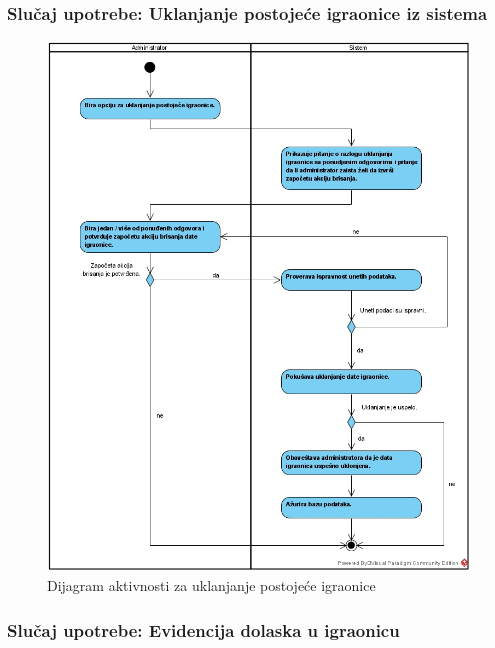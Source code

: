 \documentclass[a4paper]{article}
\begin{document}
\subsubsection{Slučaj upotrebe: Uklanjanje postojeće igraonice iz sistema}

\begin{figure}[!ht]
\begin{center}
\includegraphics[scale=0.55]{sections/images/dijagram_aktivnosti_uklanjanje_postojece_igraonice.jpg}
\end{center}
\caption{Dijagram aktivnosti za uklanjanje postojeće igraonice}
\label{fig:kontekst}
\end{figure}

\subsubsection{Slučaj upotrebe: Evidencija dolaska u igraonicu}

\end{document}
